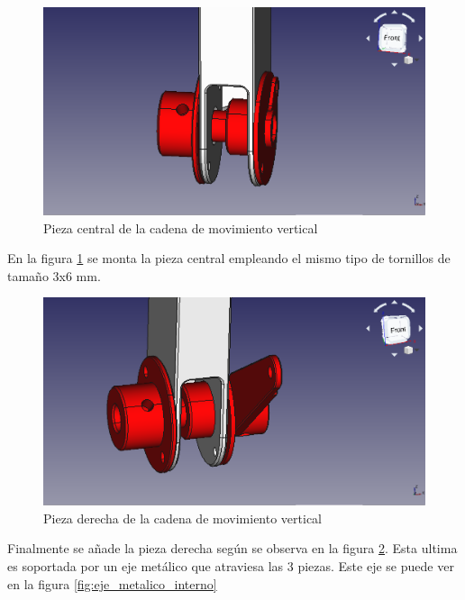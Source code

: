 \begin{figure}[H]
    \centering 
    \includegraphics[width=1\linewidth]{pictures/SoporteMotorCentral.png}
    \caption{Pieza central de la cadena de movimiento vertical}
    \label{fig:pieza_central_brazo}
\end{figure}

En la figura \ref{fig:pieza_central_brazo} se monta la pieza central empleando el mismo tipo de tornillos de tamaño 3x6 mm.

\begin{figure}[H]
    \centering 
    \includegraphics[width=1\linewidth]{pictures/SoporteMotorDerecho.png}
    \caption{Pieza derecha de la cadena de movimiento vertical}
    \label{fig:pieza_derecha_brazo}
\end{figure}

Finalmente se añade la pieza derecha según se observa en la figura \ref{fig:pieza_derecha_brazo}. Esta ultima es soportada por un eje metálico que atraviesa las 3 piezas. Este eje se puede ver en la figura \ref{fig:eje_metalico_interno}

